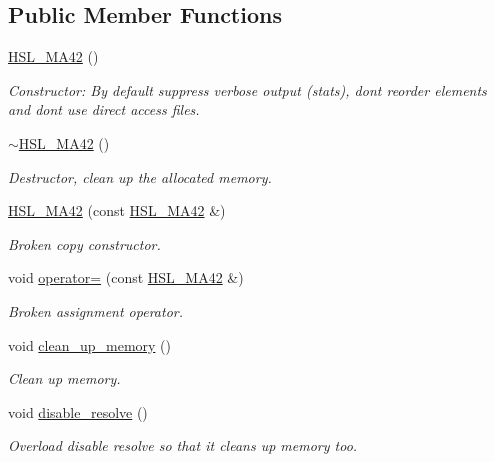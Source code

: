 \subsection*{Public Member Functions}
\begin{DoxyCompactItemize}
\item 
\hyperlink{classoomph_1_1HSL__MA42_adb51ab900d877ac6721745c1b6a9c76d}{H\+S\+L\+\_\+\+M\+A42} ()
\begin{DoxyCompactList}\small\item\em Constructor\+: By default suppress verbose output (stats), don\textquotesingle{}t reorder elements and don\textquotesingle{}t use direct access files. \end{DoxyCompactList}\item 
\hyperlink{classoomph_1_1HSL__MA42_a0987633afd0b7856dbedadab6ff8e41b}{$\sim$\+H\+S\+L\+\_\+\+M\+A42} ()
\begin{DoxyCompactList}\small\item\em Destructor, clean up the allocated memory. \end{DoxyCompactList}\item 
\hyperlink{classoomph_1_1HSL__MA42_a188fd0cf1d4159f3633a09e61d2029b0}{H\+S\+L\+\_\+\+M\+A42} (const \hyperlink{classoomph_1_1HSL__MA42}{H\+S\+L\+\_\+\+M\+A42} \&)
\begin{DoxyCompactList}\small\item\em Broken copy constructor. \end{DoxyCompactList}\item 
void \hyperlink{classoomph_1_1HSL__MA42_ae19f381a2ead0d449d0bc1ce9dc13e39}{operator=} (const \hyperlink{classoomph_1_1HSL__MA42}{H\+S\+L\+\_\+\+M\+A42} \&)
\begin{DoxyCompactList}\small\item\em Broken assignment operator. \end{DoxyCompactList}\item 
void \hyperlink{classoomph_1_1HSL__MA42_a81487397ec92afb883f0a95beb99aff0}{clean\+\_\+up\+\_\+memory} ()
\begin{DoxyCompactList}\small\item\em Clean up memory. \end{DoxyCompactList}\item 
void \hyperlink{classoomph_1_1HSL__MA42_a8419d983544da158f96ab305549a94a9}{disable\+\_\+resolve} ()
\begin{DoxyCompactList}\small\item\em Overload disable resolve so that it cleans up memory too. \end{DoxyCompactList}\item 

\end{DoxyCompactItemize}
